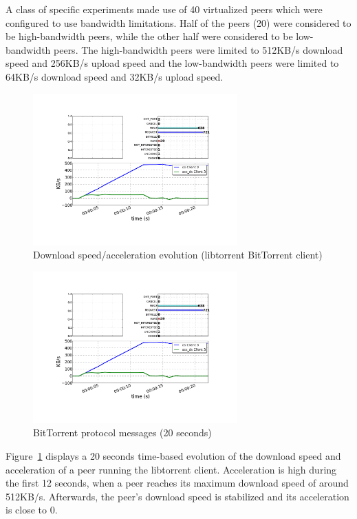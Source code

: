 A class of specific experiments made use of 40 virtualized peers which were
configured to use bandwidth limitations. Half of the peers (20) were
considered to be high-bandwidth peers, while the other half were considered to
be low-bandwidth peers. The high-bandwidth peers were limited to 512KB/s
download speed and 256KB/s upload speed and the low-bandwidth peers were
limited to 64KB/s download speed and 32KB/s upload speed.

\begin{figure}[h]
  \centering
  \includegraphics[trim = 3.8cm 4cm 4.3cm 10.7cm, clip, width =
0.7\textwidth]{src/img/virt-infra/test3}
  \caption{Download speed/acceleration evolution (libtorrent BitTorrent client)}
  \label{fig:virt-infra:down-acc}
\end{figure}

\begin{figure}[h]
  \centering
    \includegraphics[trim = 15.9cm 13.5cm 4.3cm 3cm, clip, width =
0.7\textwidth]{src/img/virt-infra/test3}
  \caption{BitTorrent protocol messages (20 seconds)}
  \label{fig:virt-infra:proto-msg}
\end{figure}

Figure~\ref{fig:virt-infra:down-acc} displays a 20 seconds time-based
evolution of the download speed and acceleration of a peer running the
libtorrent client.  Acceleration is high during the first 12 seconds, when a
peer reaches its maximum download speed of around 512KB/s. Afterwards, the
peer's download speed is stabilized and its acceleration is close to 0.

